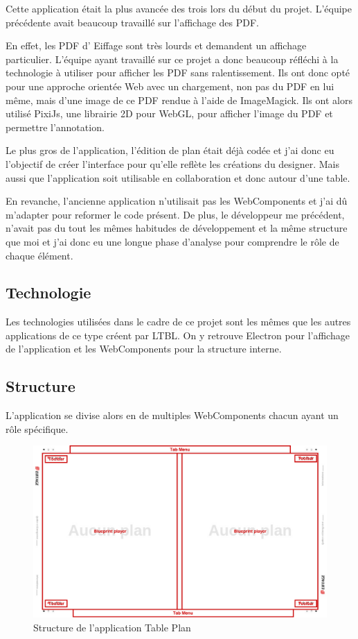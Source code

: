 Cette application était la plus avancée des trois lors du début du projet.
L'équipe précédente avait beaucoup travaillé sur l'affichage des PDF.

En effet, les PDF d’ Eiffage sont très lourds et demandent un affichage particulier.
L'équipe ayant travaillé sur ce projet a donc beaucoup réfléchi à la technologie à utiliser pour afficher les PDF sans ralentissement.
Ils ont donc opté pour une approche orientée Web avec un chargement, non pas du PDF en lui même, mais d'une image de ce PDF rendue à l'aide de ImageMagick.
Ils ont alors utilisé PixiJs, une librairie 2D pour WebGL, pour afficher l'image du PDF et permettre l'annotation.

Le plus gros de l'application, l'édition de plan était déjà codée et j'ai donc eu l'objectif de créer l'interface pour qu'elle reflète les créations du designer.
Mais aussi que l'application soit utilisable en collaboration et donc autour d'une table.

En revanche, l'ancienne application n'utilisait pas les WebComponents et j'ai dû m'adapter pour reformer le code présent.
De plus, le développeur me précédent, n'avait pas du tout les mêmes habitudes de développement et la même structure que moi et j'ai donc eu une longue phase d'analyse pour comprendre le rôle de chaque élément.

\subsection{Technologie}
\label{eiffageTablePlanTechnologie}

Les technologies utilisées dans le cadre de ce projet sont les mêmes que les autres applications de ce type créent par LTBL.
On y retrouve Electron pour l'affichage de l'application et les WebComponents pour la structure interne.

\subsection{Structure}
\label{eiffageTablePlanStructure}

L'application se divise alors en de multiples WebComponents chacun ayant un rôle spécifique.

\begin{figure}[h]
    \centering
    \includegraphics[scale=0.5]{img/table-plan-structure.pdf}
    \caption{Structure de l'application Table Plan}
\end{figure}

